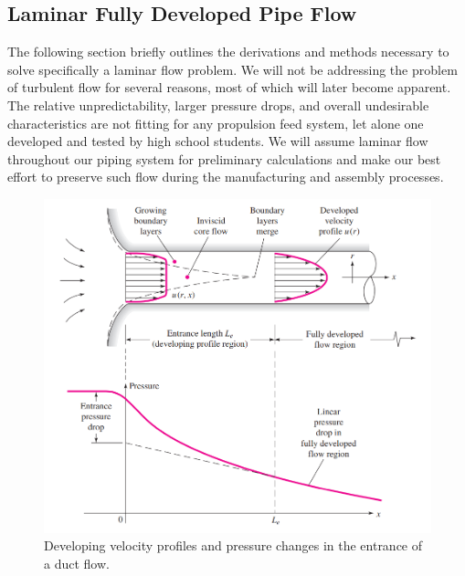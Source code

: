 \documentclass[11pt]{article} %
\numberwithin{equation}{section} %
\begin{document}
\subsection{Laminar Fully Developed Pipe Flow}
The following section briefly outlines the derivations and methods necessary to solve specifically a laminar flow problem. We will not be addressing the problem of turbulent flow for several reasons, most of which will later become apparent. The relative unpredictability, larger pressure drops, and overall undesirable characteristics are not fitting for any propulsion feed system, let alone one developed and tested by high school students. We will assume laminar flow throughout our piping system for preliminary calculations and make our best effort to preserve such flow during the manufacturing and assembly processes.
\begin{figure}[!htb] %
\centering
\includegraphics[scale=0.5]{developing_velocity_profile}
\caption{Developing velocity profiles and pressure changes in the entrance of a duct flow.}
\label{fig:developing-velocity-profile}
\end{figure}
\end{document}

